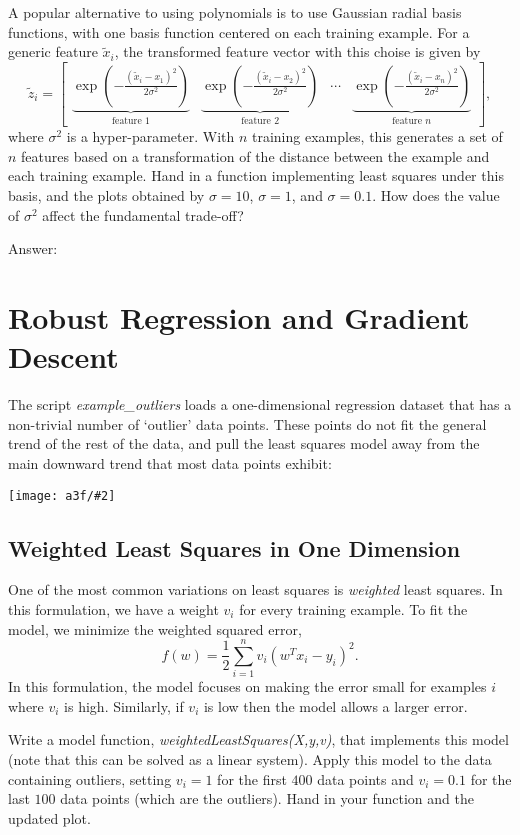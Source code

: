 \documentclass{article}
\def\ans#1{\par\gre{Answer: #1}}
\def\blu#1{{\color{blu}#1}}
\def\gre#1{{\color{gre}#1}}
\newcommand{\mat}[1]{\begin{bmatrix}#1\end{bmatrix}}
\newcommand{\centerfig}[2]{\begin{center}\texttt{[image: a3f/\#2]}\end{center}}
\begin{document}
A popular alternative to using polynomials is to use Gaussian radial basis functions, with one basis function centered on each training example. For a generic feature $\tilde{x}_i$, the transformed feature vector with this choise is given by
\[
\tilde{z}_i = \mat{\underbrace{\exp\left(-\frac{(\tilde{x}_i - x_1)^2}{2\sigma^2}\right)}_\text{feature 1} & \underbrace{\exp\left(-\frac{(\tilde{x}_i - x_2)^2}{2\sigma^2}\right)}_\text{feature 2} & \cdots & \underbrace{\exp\left(-\frac{(\tilde{x}_i - x_n)^2}{2\sigma^2}\right)}_\text{feature $n$}},
\]
where $\sigma^2$ is a hyper-parameter. With $n$ training examples, this generates a set of $n$ features based on a transformation of the distance between the example and each training example. \blu{Hand in a function implementing least squares under this basis, and the plots obtained by $\sigma=10$, $\sigma=1$, and $\sigma=0.1$. How does the value of $\sigma^2$ affect the fundamental trade-off?}
\ans{}


\pagebreak

\section{Robust Regression and Gradient Descent}

The script \emph{example\_outliers} loads a one-dimensional regression dataset that has a non-trivial number of `outlier' data points. These points do not fit the general trend of the rest of the data, and pull the least squares model away from the main downward trend that most data points exhibit:
\centerfig{.7}{outliers}



\pagebreak

\subsection{Weighted Least Squares in One Dimension}

One of the most common variations on least squares is \emph{weighted} least squares. In this formulation, we have a weight $v_i$ for every training example. To fit the model, we minimize the weighted squared error,
\[
f(w) =  \frac{1}{2}\sum_{i=1}^n v_i(w^Tx_i - y_i)^2.
\]
In this formulation, the model focuses on making the error small for examples $i$ where $v_i$ is high. Similarly, if $v_i$ is low then the model allows a larger error.

Write a model function, \emph{weightedLeastSquares(X,y,v)}, that implements this model (note that this can be solved as a linear system).
Apply this model to the data containing outliers, setting $v_i = 1$ for the first $400$ data points and $v_i = 0.1$ for the last $100$ data points (which are the outliers). \blu{Hand in your function and the updated plot}.
\end{document}
